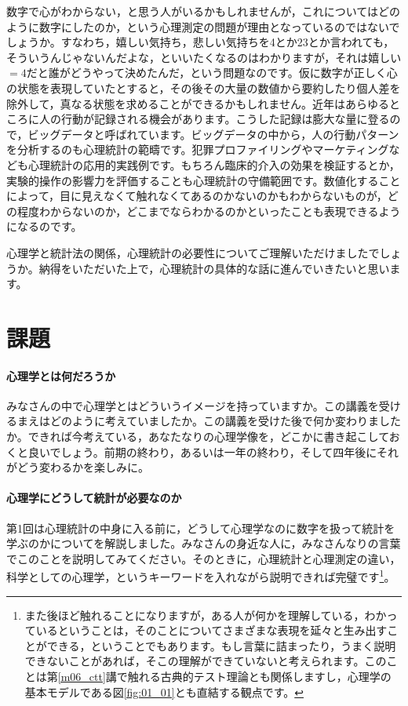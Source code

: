 \documentclass{ltjsbook}
\begin{document}
数字で心がわからない，と思う人がいるかもしれませんが，これについてはどのように数字にしたのか，という心理測定の問題が理由となっているのではないでしょうか。すなわち，嬉しい気持ち，悲しい気持ちを4とか23とか言われても，そういうんじゃないんだよな，といいたくなるのはわかりますが，それは嬉しい$=4$だと誰がどうやって決めたんだ，という問題なのです。仮に数字が正しく心の状態を表現していたとすると，その後その大量の数値から要約したり個人差を除外して，真なる状態を求めることができるかもしれません。近年はあらゆるところに人の行動が記録される機会があります。こうした記録は膨大な量に登るので，ビッグデータと呼ばれています。ビッグデータの中から，人の行動パターンを分析するのも心理統計の範疇です。犯罪プロファイリングやマーケティングなども心理統計の応用的実践例です。もちろん臨床的介入の効果を検証するとか，実験的操作の影響力を評価することも心理統計の守備範囲です。数値化することによって，目に見えなくて触れなくてあるのかないのかもわからないものが，どの程度わからないのか，どこまでならわかるのかといったことも表現できるようになるのです。

心理学と統計法の関係，心理統計の必要性についてご理解いただけましたでしょうか。納得をいただいた上で，心理統計の具体的な話に進んでいきたいと思います。
\section{課題}
\paragraph{心理学とは何だろうか}
みなさんの中で心理学とはどういうイメージを持っていますか。この講義を受けるまえはどのように考えていましたか。この講義を受けた後で何か変わりましたか。できれば今考えている，あなたなりの心理学像を，どこかに書き起こしておくと良いでしょう。前期の終わり，あるいは一年の終わり，そして四年後にそれがどう変わるかを楽しみに。
\paragraph{心理学にどうして統計が必要なのか}
第1回は心理統計の中身に入る前に，どうして心理学なのに数字を扱って統計を学ぶのかについてを解説しました。みなさんの身近な人に，みなさんなりの言葉でこのことを説明してみてください。そのときに，心理統計と心理測定の違い，科学としての心理学，というキーワードを入れながら説明できれば完璧です\footnote{また後ほど触れることになりますが，ある人が何かを理解している，わかっているということは，そのことについてさまざまな表現を延々と生み出すことができる，ということでもあります。もし言葉に詰まったり，うまく説明できないことがあれば，そこの理解ができていないと考えられます。このことは第\ref{m06_ctt}講で触れる古典的テスト理論とも関係しますし，心理学の基本モデルである図\ref{fig:01_01}とも直結する観点です。}。
\end{document}
